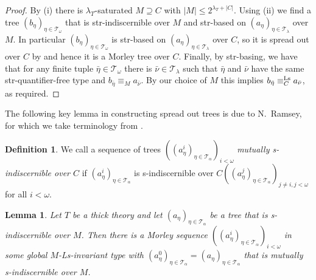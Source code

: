 \documentclass[a4paper, reqno]{amsart}
\newtheorem{lemma}[theorem]{Lemma}
\theoremstyle{definition}
\newtheorem{definition}[theorem]{Definition}
\theoremstyle{repeat}
\newcommand{\T}{\mathcal{T}}
\newcommand{\equivls}{\equiv^\textup{Ls}}
\begin{document}
\begin{proof}
By (i) there is $\lambda_T$-saturated $M \supseteq C$ with $|M| \leq 2^{\lambda_T + |C|}$. Using (ii) we find a tree $(b_\eta)_{\eta \in \T_\omega}$ that is str-indiscernible over $M$ and str-based on $(a_\eta)_{\eta \in \T_\lambda}$ over $M$. In particular $(b_\eta)_{\eta \in \T_\omega}$ is str-based on $(a_\eta)_{\eta \in \T_\lambda}$ over $C$, so it is spread out over $C$ by  and hence it is a Morley tree over $C$. Finally, by str-basing, we have that for any finite tuple $\bar{\eta} \in \T_\omega$ there is $\bar{\nu} \in \T_\lambda$ such that $\bar{\eta}$ and $\bar{\nu}$ have the same str-quantifier-free type and $b_{\bar{\eta}} \equiv_M a_{\bar{\nu}}$. By our choice of $M$ this implies $b_{\bar{\eta}} \equivls_C a_{\bar{\nu}}$, as required.
\end{proof}
The following key lemma in constructing spread out trees is due to N.\ Ramsey, for which we take terminology from \cite[Definition 1.14]{chernikov_transitivity_2023}.
\begin{definition}
We call a sequence of trees $((a^i_\eta)_{\eta \in \T_\alpha})_{i < \omega}$ \emph{mutually s-indiscernible over $C$} if $(a^i_\eta)_{\eta \in \T_\alpha}$ is s-indiscernible over $C((a^j_\eta)_{\eta \in \T_\alpha})_{j \neq i, j < \omega}$ for all $i < \omega$.
\end{definition}
\begin{lemma}
Let $T$ be a thick theory and let $(a_\eta)_{\eta \in \T_\alpha}$ be a tree that is s-indiscernible over $M$. Then there is a Morley sequence $((a^i_\eta)_{\eta \in \T_\alpha})_{i < \omega}$ in some global $M$-Ls-invariant type with $(a^0_\eta)_{\eta \in \T_\alpha} = (a_\eta)_{\eta \in \T_\alpha}$ that is mutually s-indiscernible over $M$.
\end{lemma}
\end{document}

